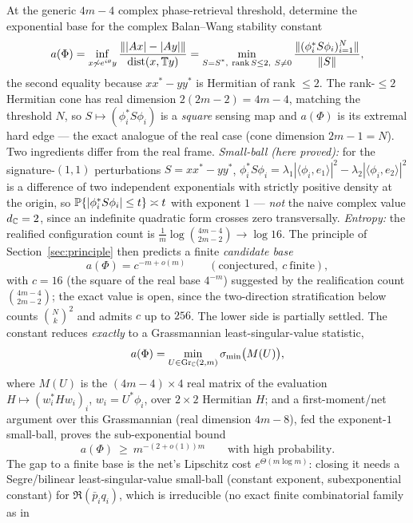 \begin{problem}\label{prob:complex-pr}
At the generic \(4m-4\) complex phase-retrieval threshold, determine the exponential base for the
complex Balan--Wang stability constant
\[
  a(\Phi)=\inf_{x\not\sim e^{i\theta}y}
  \frac{\||Ax|-|Ay|\|}{\operatorname{dist}(x,\mathbb T y)}
  =\min_{\substack{S=S^*,\ \operatorname{rank} S\le2,\ S\ne0}}
  \frac{\|(\phi_i^*S\phi_i)_{i=1}^N\|}{\|S\|},
\]
the second equality because \(xx^*-yy^*\) is Hermitian of rank \(\le2\).  The rank-\(\le2\) Hermitian
cone has real dimension \(2(2m-2)=4m-4\), matching the threshold \(N\), so
\(S\mapsto(\phi_i^*S\phi_i)\) is a \emph{square} sensing map and \(a(\Phi)\) is its extremal hard edge
--- the exact analogue of the real case (cone dimension \(2m-1=N\)).  Two ingredients differ from the
real frame.  \emph{Small-ball (here proved):} for the signature-\((1,1)\) perturbations
\(S=xx^*-yy^*\), \(\phi_i^*S\phi_i=\lambda_1|\langle\phi_i,e_1\rangle|^2-\lambda_2|\langle\phi_i,e_2\rangle|^2\)
is a difference of two independent exponentials with strictly positive density at the origin, so
\(\mathbb{P}\{|\phi_i^*S\phi_i|\le t\}\asymp t\) with exponent \(1\) --- \emph{not} the naive complex value
\(d_{\mathbb{C}}=2\), since an indefinite quadratic form crosses zero transversally.  \emph{Entropy:} the
realified configuration count is \(\tfrac1m\log\binom{4m-4}{2m-2}\to\log16\).  The principle of
Section~\ref{sec:principle} then predicts a finite \emph{candidate base}
\[
  a(\Phi)=c^{-m+o(m)}\qquad(\text{conjectured},\ c\ \text{finite}),
\]
with \(c=16\) (the square of the real base \(4^{-m}\)) suggested by the realification count
\(\binom{4m-4}{2m-2}\); the exact value is open, since the two-direction stratification below counts
\(\binom{N}{k}^2\) and admits \(c\) up to \(256\).  The lower side is partially settled.  The constant reduces
\emph{exactly} to a Grassmannian least-singular-value statistic,
\[
  a(\Phi)=\min_{U\in\mathrm{Gr}_{\mathbb{C}}(2,m)}\sigma_{\min}\big(M(U)\big),
\]
where \(M(U)\) is the \((4m-4)\times4\) real matrix of the evaluation
\(H\mapsto(w_i^*Hw_i)_i\), \(w_i=U^*\phi_i\), over \(2\times2\) Hermitian \(H\); and a first-moment/net
argument over this Grassmannian (real dimension \(4m-8\)), fed the exponent-\(1\) small-ball, proves the
sub-exponential bound
\[
  a(\Phi)\ \ge\ m^{-(2+o(1))m}\qquad\text{with high probability.}
\]
The gap to a finite base is the net's Lipschitz cost \(e^{\Theta(m\log m)}\):
closing it needs a Segre/bilinear least-singular-value small-ball (constant exponent, subexponential
constant) for \(\Re(\bar p_iq_i)\), which is irreducible (no exact finite combinatorial family as in

\end{problem}
